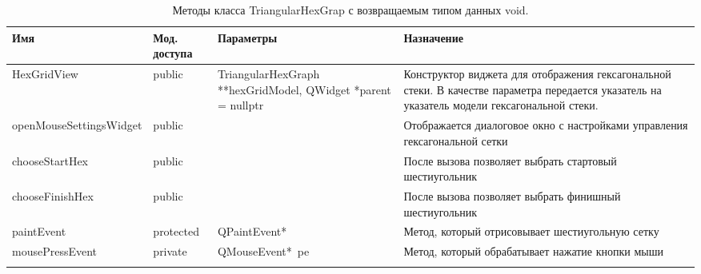 \begin{longtable}[c]{|p{2cm}|p{2cm}|p{2.3cm}|p{7.7cm}|}
\\
\hline
\multicolumn{1}{|p{2cm}|}{\textbf{Имя}} & \multicolumn{1}{p{2cm}|}{\textbf{Мод. доступа}} & \multicolumn{1}{p{2cm}|}{\textbf{Параме\-тры}}                      & \multicolumn{1}{p{8cm}|}{\textbf{Назначение}}                                                                                                      \\ \hline
\endfirsthead
%
\endhead
%
HexGrid\-View                       & public                                     & Triangular\-HexGraph **hexGrid\-Model, QWidget *parent = nullptr & Конструктор виджета для отображения гексагональной стеки. В качестве параметра передается указатель на указатель модели гексагональной стеки. \\ \hline
openMou\-seSetti\-ngsWidget           & public                                     &                                                              & Отображается диалоговое окно с настройками управления гексагональной сетки                                                                    \\ \hline
choose\-Start\-Hex                    & public                                     &                                                              & После вызова позволяет выбрать стартовый шестиугольник                                                                                        \\ \hline
choose\-Finish\-Hex                   & public                                     &                                                              & После вызова позволяет выбрать финишный шестиугольник                                                                                         \\ \hline
paint\-Event                        & protected                                  & QPaint\-Event*                                                 & Метод, который отрисовывает шестиугольную сетку                                                                                               \\ \hline
mouse\-Press\-Event                   & private                                    & QMouse\-Event*~pe                                              & Метод, который обрабатывает нажатие кнопки мыши       
\\ \hline  
\caption{Методы класса TriangularHexGrap с возвращаемым типом данных void.}
\label{my-label}\\                                                                                     
\end{longtable}


